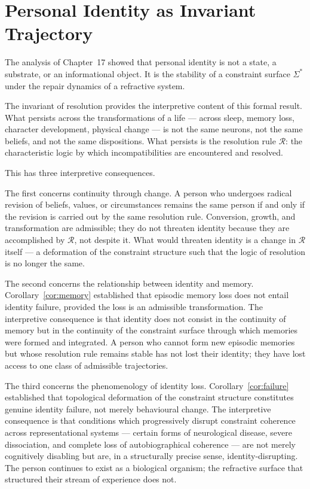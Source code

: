 \documentclass[11pt,openany]{book}
\begin{document}
\section{Personal Identity as Invariant Trajectory}
\label{sec:personal-identity}

The analysis of Chapter~17 showed that personal identity is
not a state, a substrate, or an informational object.  It
is the stability of a constraint surface $\Sigma^*$ under
the repair dynamics of a refractive system.

The invariant of resolution provides the interpretive
content of this formal result.  What persists across the
transformations of a life --- across sleep, memory loss,
character development, physical change --- is not the same
neurons, not the same beliefs, and not the same
dispositions.  What persists is the resolution rule
$\mathcal{R}$: the characteristic logic by which
incompatibilities are encountered and resolved.

This has three interpretive consequences.

The first concerns continuity through change.  A person who
undergoes radical revision of beliefs, values, or
circumstances remains the same person if and only if the
revision is carried out by the same resolution rule.
Conversion, growth, and transformation are admissible; they
do not threaten identity because they are accomplished by
$\mathcal{R}$, not despite it.  What would threaten
identity is a change in $\mathcal{R}$ itself --- a
deformation of the constraint structure such that the logic
of resolution is no longer the same.

The second concerns the relationship between identity and
memory.  Corollary~\ref{cor:memory} established that
episodic memory loss does not entail identity failure,
provided the loss is an admissible transformation.  The
interpretive consequence is that identity does not consist
in the continuity of memory but in the continuity of the
constraint surface through which memories were formed and
integrated.  A person who cannot form new episodic memories
but whose resolution rule remains stable has not lost their
identity; they have lost access to one class of admissible
trajectories.

The third concerns the phenomenology of identity loss.
Corollary~\ref{cor:failure} established that topological
deformation of the constraint structure constitutes genuine
identity failure, not merely behavioural change.  The
interpretive consequence is that conditions which
progressively disrupt constraint coherence across
representational systems --- certain forms of neurological
disease, severe dissociation, and complete loss of
autobiographical coherence --- are not merely cognitively
disabling but are, in a structurally precise sense,
identity-disrupting.  The person continues to exist as a
biological organism; the refractive surface that structured
their stream of experience does not.
\end{document}
